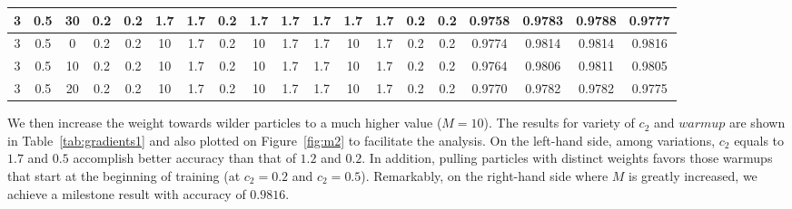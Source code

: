 \documentclass{ieeeaccess}
\begin{document}
\begin{table*}
{\begin{tabular}{|c|c|c|c|c|c|c|c|c|c|c|c|c|c|c|c|c|c|c|}
\hline
3 & 0.5                   & 30     & 0.2                     & 0.2                     & 1.7                     & 1.7                     & 0.2                     & 1.7                     & 1.7                     & 1.7                     & 1.7                     & 1.7                     & 0.2                     & 0.2 & \textcolor[rgb]{0.122,0.122,0.129}{0.9758} & \textcolor[rgb]{0.122,0.122,0.129}{0.9783} & \textcolor[rgb]{0.122,0.122,0.129}{0.9788} & \textcolor[rgb]{0.122,0.122,0.129}{0.9777}  \\ 
\hline
3 & 0.5                   & 0      & 0.2                     & 0.2                     & 10                      & 1.7                     & 0.2                     & 10                      & 1.7                     & 1.7                     & 10                      & 1.7                     & 0.2                     & 0.2 & \textcolor[rgb]{0.122,0.122,0.129}{0.9774} & \textcolor[rgb]{0.122,0.122,0.129}{0.9814} & \textcolor[rgb]{0.122,0.122,0.129}{0.9814} & \textcolor[rgb]{0.122,0.122,0.129}{0.9816}  \\ 
\hline
3 & 0.5                   & 10     & 0.2                     & 0.2                     & 10                      & 1.7                     & 0.2                     & 10                      & 1.7                     & 1.7                     & 10                      & 1.7                     & 0.2                     & 0.2 & \textcolor[rgb]{0.122,0.122,0.129}{0.9764} & \textcolor[rgb]{0.122,0.122,0.129}{0.9806} & \textcolor[rgb]{0.122,0.122,0.129}{0.9811} & \textcolor[rgb]{0.122,0.122,0.129}{0.9805}  \\ 
\hline
3 & 0.5                   & 20     & 0.2                     & 0.2                     & 10                      & 1.7                     & 0.2                     & 10                      & 1.7                     & 1.7                     & 10                      & 1.7                     & 0.2                     & 0.2 & \textcolor[rgb]{0.122,0.122,0.129}{0.9770} & \textcolor[rgb]{0.122,0.122,0.129}{0.9782} & \textcolor[rgb]{0.122,0.122,0.129}{0.9782} & \textcolor[rgb]{0.122,0.122,0.129}{0.9775}  \\
\hline
\end{tabular}
}
\end{table*} 

We then increase the weight towards wilder particles to a much higher value ($M=10$). The results for variety of $c_2$ and $warmup$ are shown in Table~\ref{tab:gradients1} and also plotted on Figure~\ref{fig:m2} to facilitate the analysis. On the left-hand side, among variations, $c_2$ equals to $1.7$ and $0.5$ accomplish better accuracy than that of $1.2$ and $0.2$. In addition, pulling particles with distinct weights favors those warmups that start at the beginning of training (at $c_2=0.2$ and $c_2=0.5$). Remarkably, on the right-hand side where $M$ is greatly increased, we achieve a milestone result with accuracy of $0.9816$.
\end{document}
